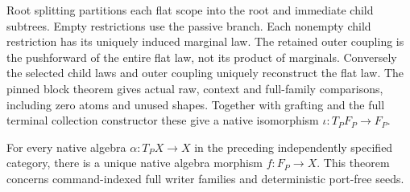 \documentclass[11pt]{article}
\begin{document}
Root splitting partitions each flat scope into the root and immediate child subtrees. Empty restrictions use the passive branch. Each nonempty child restriction has its uniquely induced marginal law. The retained outer coupling is the pushforward of the entire flat law, not its product of marginals. Conversely the selected child laws and outer coupling uniquely reconstruct the flat law. The pinned block theorem gives actual raw, context and full-family comparisons, including zero atoms and unused shapes. Together with grafting and the full terminal collection constructor these give a native isomorphism $\iota:T_PF_P\to F_P$.

\begin{theorem}
For every native algebra $\alpha:T_PX\to X$ in the preceding independently specified category, there is a unique native algebra morphism $f:F_P\to X$. This theorem concerns command-indexed full writer families and deterministic port-free seeds.
\end{theorem}
\end{document}
